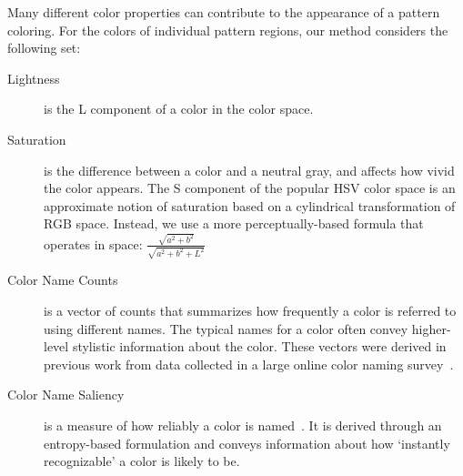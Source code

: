 Many different color properties can contribute to the appearance of a pattern coloring. For the colors of individual pattern regions, our method considers the following set:
\begin{description}
	\item[Lightness] is the L component of a color in the \lab color space.~
	\item[Saturation] is the difference between a color and a neutral gray, and affects how vivid the color appears. The S component of the popular HSV color space is an approximate notion of saturation based on a cylindrical transformation of RGB space. Instead, we use a more perceptually-based formula that operates in \lab space: $\frac{\sqrt{a^2+b^2}}{\sqrt{a^2+b^2+L^2}}$ ~\cite{ColorfulnessReference}
	\item[Color Name Counts] is a vector of counts that summarizes how frequently a color is referred to using different names. The typical names for a color often convey higher-level stylistic information about the color. These vectors were derived in previous work from data collected in a large online color naming survey~\cite{ColorNamingModels}.
	\item[Color Name Saliency] is a measure of how reliably a color is named~\cite{ColorNamingModels}. It is derived through an entropy-based formulation and conveys information about how `instantly recognizable' a color is likely to be.
\end{description}

